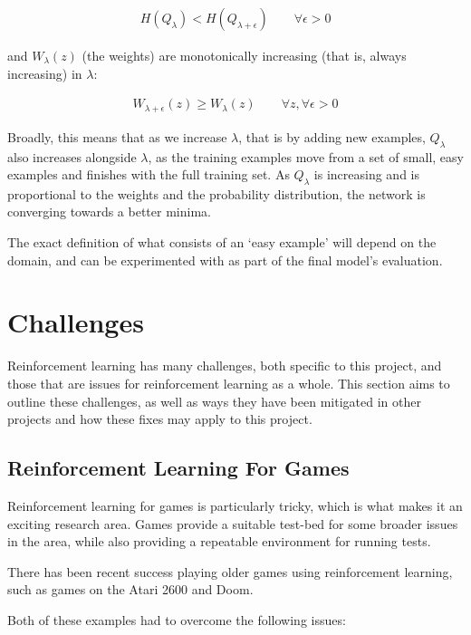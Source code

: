 \begin{align}
    H(Q_{\lambda}) < H(Q_{\lambda + \epsilon}) \qquad \forall \epsilon > 0
\end{align}

and $W_{\lambda}(z)$ (the weights) are monotonically increasing (that is, always
increasing) in $\lambda$:

\begin{align}
    W_{\lambda + \epsilon}(z) \ge W_{\lambda}(z) \qquad
    \forall z, \forall \epsilon > 0
\end{align}

Broadly, this means that as we increase $\lambda$, that is by adding new
examples, $Q_{\lambda}$ also increases alongside $\lambda$, as the training
examples move from a set of small, easy examples and finishes with the full
training set. As $Q_{\lambda}$ is increasing and is proportional to the weights
and the probability distribution, the network is converging towards a better
minima.

The exact definition of what consists of an `easy example' will depend on the
domain, and can be experimented with as part of the final model's evaluation.

\section{Challenges}

Reinforcement learning has many challenges, both specific to this
project, and those that are issues for reinforcement learning as a whole.
This section aims to outline these challenges, as well as ways they have been
mitigated in other projects and how these fixes may apply to this project.

\subsection{Reinforcement Learning For Games}\label{challenges:games}

Reinforcement learning for games is particularly tricky, which is what makes it
an exciting research area. Games provide a suitable test-bed for some broader
issues in the area, while also providing a repeatable environment for running
tests.

There has been recent success playing older games using reinforcement learning,
such as games on the Atari 2600\cite{mnih2013playing} and
Doom\cite{kempka2016vizdoom}.

Both of these examples had to overcome the following issues:

